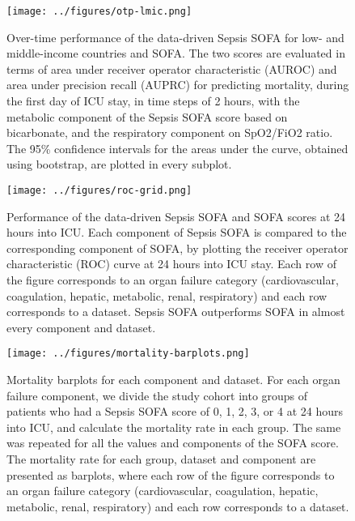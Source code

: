 \documentclass[
]{article}
\begin{document}
\begin{figure}
    \centering
    \texttt{[image: ../figures/otp-lmic.png]}
    \caption{Over-time performance of the data-driven Sepsis SOFA for low- and
    middle-income countries and SOFA. The two scores are evaluated in terms of
    area under receiver operator characteristic (AUROC) and area under precision
    recall (AUPRC) for predicting mortality, during the first day of ICU stay,
    in time steps of 2 hours, with the metabolic component of the Sepsis SOFA score
    based on bicarbonate, and the respiratory component on SpO2/FiO2 ratio. The
    95\% confidence intervals for the areas under the curve, obtained using
    bootstrap, are plotted in every subplot.}
\end{figure}

\begin{figure}
    \centering
    \texttt{[image: ../figures/roc-grid.png]}
    \caption{Performance of the data-driven Sepsis SOFA and SOFA scores at 24
    hours into ICU. Each component of Sepsis SOFA is compared to the corresponding
    component of SOFA, by plotting the receiver operator characteristic (ROC)
    curve at 24 hours into ICU stay. Each row of the figure corresponds to an
    organ failure category (cardiovascular, coagulation, hepatic,
    metabolic, renal, respiratory) and each row corresponds to a dataset.
    Sepsis SOFA outperforms SOFA in almost every component and dataset.}
\end{figure}

\begin{figure}
    \centering
    \texttt{[image: ../figures/mortality-barplots.png]}
    \caption{Mortality barplots for each component and dataset. For each organ
    failure component, we divide the study cohort into groups of patients who
    had a Sepsis SOFA score of 0, 1, 2, 3, or 4 at 24 hours into ICU, and
    calculate the mortality rate in each group. The same was repeated for all
    the values and components of the SOFA score. The mortality rate for each
    group, dataset and component are presented as barplots, where each row of
    the figure corresponds to an organ failure category (cardiovascular,
    coagulation, hepatic, metabolic, renal, respiratory) and each row corresponds
    to a dataset.}
\end{figure}
\end{document}
